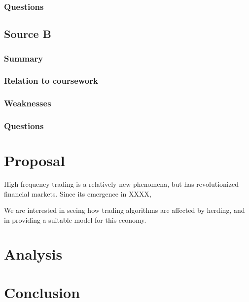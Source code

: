 \documentclass{article}
\begin{document}
\subsubsection{Questions}

\subsection{Source B}
\subsubsection{Summary}
\subsubsection{Relation to coursework}
\subsubsection{Weaknesses}
\subsubsection{Questions}

\section{Proposal}

High-frequency trading is a relatively new phenomena, but has revolutionized financial markets. 
Since its emergence in XXXX, 

We are interested in seeing how trading algorithms are affected by herding, and in providing a suitable model for this economy.

\section{Analysis}

\section{Conclusion}



\end{document}
